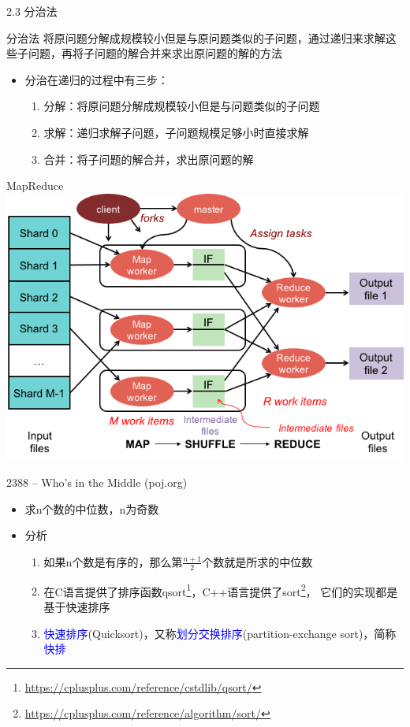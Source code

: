 \begin{frame}{2.3 分治法}
    \begin{block}{分治法}
        将原问题分解成规模较小但是与原问题类似的子问题，通过递归来求解这些子问题，再将子问题的解合并来求出原问题的解的方法
    \end{block}
    \vfill
    \begin{itemize}
        \item 分治在递归的过程中有三步：
        \begin{enumerate}
            \item 分解：将原问题分解成规模较小但是与问题类似的子问题
            \item 求解：递归求解子问题，子问题规模足够小时直接求解
            \item 合并：将子问题的解合并，求出原问题的解
        \end{enumerate}
    \end{itemize}
\end{frame}
\begin{frame}{MapReduce}
    \includegraphics[width=\textwidth]{fig/mapreduce.png}
\end{frame}
\begin{frame}{2388 -- Who's in the Middle (poj.org)}
    \begin{itemize}
        \item 求n个数的中位数，n为奇数
    \end{itemize}
    \vfill
    \begin{itemize}
        \item 分析
        \begin{enumerate}
            \item 如果n个数是有序的，那么第$\frac{n+1}{2}$个数就是所求的中位数
            \item 在C语言提供了排序函数qsort\footnote{\url{https://cplusplus.com/reference/cstdlib/qsort/}}，C++语言提供了sort\footnote{\url{https://cplusplus.com/reference/algorithm/sort/}}， 它们的实现都是基于快速排序
            \item \textcolor{blue}{快速排序}(Quicksort)，又称\textcolor{blue}{划分交换排序}(partition-exchange sort)，简称\textcolor{blue}{快排}
        \end{enumerate}
    \end{itemize}
\end{frame}
